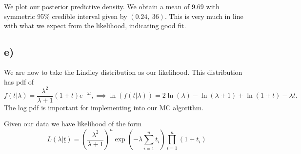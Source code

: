 \documentclass[12pt]{extarticle}
\begin{document}
We plot our posterior predictive density. We obtain a mean of $9.69$ with symmetric 95\% credible interval given by $(0.24, \  36)$. This is very much in line with what we expect from the likelihood, indicating good fit.

\subsection*{e)}
We are now to take the Lindley distribution as our likelihood. This distribution has pdf of
\[
f(t|\lambda) = \frac{\lambda^2}{\lambda+1}(1+t)e^{-\lambda t}, \implies \ln(f(t|\lambda)) = 2\ln(\lambda) - \ln(\lambda + 1) + \ln(1+t) - \lambda t.
\]
The log pdf is important for implementing into our MC algorithm. 

Given our data we have likelihood of the form 
\[
L(\lambda|\underline{t}) = \left(\frac{\lambda^2}{\lambda+1}\right)^n\exp\left(-\lambda\sum_{i=1}^{n}t_i\right)\prod_{i=1}^{n}(1+t_i)
\]
\end{document}

